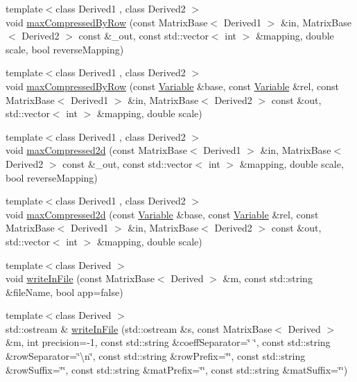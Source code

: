 \begin{DoxyCompactItemize}
\item 
{\footnotesize template$<$class Derived1 , class Derived2 $>$ }\\void \hyperlink{namespaceocra_1_1utils_a6216ad7fe2fb3ce0e894167f8f7d08b8}{max\+Compressed\+By\+Row} (const Matrix\+Base$<$ Derived1 $>$ \&in, Matrix\+Base$<$ Derived2 $>$ const \&\+\_\+out, const std\+::vector$<$ int $>$ \&mapping, double scale, bool reverse\+Mapping)
\item 
{\footnotesize template$<$class Derived1 , class Derived2 $>$ }\\void \hyperlink{namespaceocra_1_1utils_a0d2b985e493c0d62782921b92d0f92a9}{max\+Compressed\+By\+Row} (const \hyperlink{classocra_1_1Variable}{Variable} \&base, const \hyperlink{classocra_1_1Variable}{Variable} \&rel, const Matrix\+Base$<$ Derived1 $>$ \&in, Matrix\+Base$<$ Derived2 $>$ const \&out, std\+::vector$<$ int $>$ \&mapping, double scale)
\item 
{\footnotesize template$<$class Derived1 , class Derived2 $>$ }\\void \hyperlink{namespaceocra_1_1utils_ac4a24bd4a452b6c09129dcf5b7f620a2}{max\+Compressed2d} (const Matrix\+Base$<$ Derived1 $>$ \&in, Matrix\+Base$<$ Derived2 $>$ const \&\+\_\+out, const std\+::vector$<$ int $>$ \&mapping, double scale, bool reverse\+Mapping)
\item 
{\footnotesize template$<$class Derived1 , class Derived2 $>$ }\\void \hyperlink{namespaceocra_1_1utils_ab1811bfb0b7d5ab451e9fea88093027e}{max\+Compressed2d} (const \hyperlink{classocra_1_1Variable}{Variable} \&base, const \hyperlink{classocra_1_1Variable}{Variable} \&rel, const Matrix\+Base$<$ Derived1 $>$ \&in, Matrix\+Base$<$ Derived2 $>$ const \&out, std\+::vector$<$ int $>$ \&mapping, double scale)
\item 
{\footnotesize template$<$class Derived $>$ }\\void \hyperlink{namespaceocra_1_1utils_a3f12986cd4d4a40293f6003d9a86a45c}{write\+In\+File} (const Matrix\+Base$<$ Derived $>$ \&m, const std\+::string \&file\+Name, bool app=false)
\item 
{\footnotesize template$<$class Derived $>$ }\\std\+::ostream \& \hyperlink{namespaceocra_1_1utils_a427cb364866e628ab46a22707f9bdd0e}{write\+In\+File} (std\+::ostream \&s, const Matrix\+Base$<$ Derived $>$ \&m, int precision=-\/1, const std\+::string \&coeff\+Separator=\char`\"{} \char`\"{}, const std\+::string \&row\+Separator=\char`\"{}\textbackslash{}n\char`\"{}, const std\+::string \&row\+Prefix=\char`\"{}\char`\"{}, const std\+::string \&row\+Suffix=\char`\"{}\char`\"{}, const std\+::string \&mat\+Prefix=\char`\"{}\char`\"{}, const std\+::string \&mat\+Suffix=\char`\"{}\char`\"{})

\end{DoxyCompactItemize}
